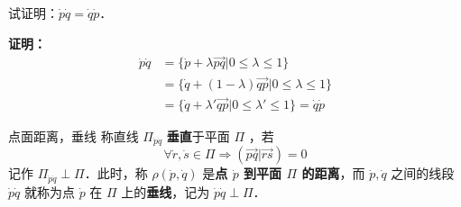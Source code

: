 \begin{example}{}
试证明：$\dot p\dot q=\dot q\dot p$．

\textbf{证明：}
\begin{equation}
\begin{aligned}
\dot p\dot q&=\{\dot p+\lambda\vec{pq}|0\leq\lambda\leq1\}\\
&=\{\dot q+(1-\lambda)\vec{qp}|0\leq\lambda\leq1\}\\
&=\{\dot q+\lambda'\vec{qp}|0\leq\lambda'\leq1\}=\dot q\dot p
\end{aligned}
\end{equation}
\end{example}
\begin{definition}{点面距离，垂线}
称直线 $\Pi_{\dot p\dot q}$ \textbf{垂直}于平面 $\Pi$ ，若
\begin{equation}
\forall \dot r,\dot s\in\Pi\Rightarrow (\vec{pq}|\vec{rs})=0
\end{equation}
记作 $\Pi_{\dot p\dot q}\perp\Pi$．此时，称 $\rho(\dot p,\dot q)$ 是\textbf{点 $\dot p$ 到平面 $\Pi$ 的距离}，而 $\dot p,\dot q$ 之间的线段 $\dot p\dot q$ 就称为点 $\dot p$ 在 $\Pi$ 上的\textbf{垂线}，记为 $\dot p\dot q\perp\Pi$．
\end{definition}